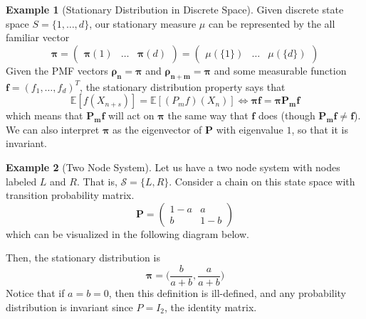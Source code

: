 \documentclass{article}
\theoremstyle{definition}
\newtheorem{example}{Example}[section]
\theoremstyle{remark}
\theoremstyle{definition}
\begin{document}
\begin{example}[Stationary Distribution in Discrete Space]
Given discrete state space $S = \{1, \ldots, d\}$, our stationary measure $\mu$ can be represented by the all familiar vector 
\[\boldsymbol{\pi} = \begin{pmatrix} \boldsymbol{\pi} (1) & \ldots & \boldsymbol{\pi} (d) \end{pmatrix} = \begin{pmatrix} \mu(\{1\}) & \ldots & \mu(\{d\}) \end{pmatrix}\] 
Given the PMF vectors $\boldsymbol{\rho_n} = \boldsymbol{\pi}$ and $\boldsymbol{\rho_{n + m}} = \boldsymbol{\pi}$ and some measurable function $\mathbf{f} = (f_1, \ldots, f_d)^T$, the stationary distribution property says that 
\[\mathbb{E}[f(X_{n + s})] = \mathbb{E}[(P_m f)(X_n)] \iff \boldsymbol{\pi} \mathbf{f} = \boldsymbol{\pi} \mathbf{P_m} \mathbf{f}\]
which means that $\mathbf{P_m} \mathbf{f}$ will act on $\boldsymbol{\pi}$ the same way that $\mathbf{f}$ does (though $\mathbf{P_m} \mathbf{f} \neq \mathbf{f}$). We can also interpret $\boldsymbol{\pi}$ as the eigenvector of $\mathbf{P}$ with eigenvalue $1$, so that it is invariant. 
\end{example}

\begin{example}[Two Node System]
Let us have a two node system with nodes labeled $L$ and $R$. That is, $\mathcal{S} = \{L, R\}$. Consider a chain on this state space with transition probability matrix. 
\[\mathbf{P} = \begin{pmatrix}
1-a & a \\ b & 1-b 
\end{pmatrix}\]
which can be visualized in the following diagram below.
\begin{center}
\end{center}

Then, the stationary distribution is 
\[\boldsymbol{\pi} = \Big( \frac{b}{a+b}, \frac{a}{a+b} \Big)\]
Notice that if $a = b = 0$, then this definition is ill-defined, and any probability distribution is invariant since $P = I_2$, the identity matrix. 
\end{example}
\end{document}
